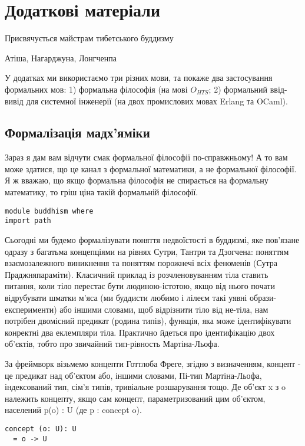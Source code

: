 \chapter{Додаткові матеріали}
\epigraph{Присвячується майстрам тибетського буддизму}{Атіша, Нагарджуна, Лонгченпа}

У додатках ми використаємо три різних мови, та покаже два застосування
формальних мов: 1) формальна філософія (на мові $O_{HTS}$; 2) формальний ввід-вивід для
системної інженерії (на двох промислових мовах Erlang та OCaml).

\section{Формалізація мадх'яміки}

Зараз я дам вам відчути смак формальної філософії по-справжньому!
А то вам може здатися, що це канал з формальної математики, а не
формальної філософії. Я ж вважаю, що якщо формальна філософія не
спирається на формальну математику, то гріш ціна такій формальній філософії.

\begin{lstlisting}
module buddhism where
import path
\end{lstlisting}

Сьогодні ми будемо формалізувати поняття недвоїстості в буддизмі,
яке пов'язане одразу з багатьма концепціями на рівнях Сутри, Тантри
та Дзогчена: поняттям взаємозалежного виникнення та поняттям порожнечі
всіх феноменів (Сутра Праджняпараміти). Класичний приклад із
розчленовуванням тіла ставить питання, коли тіло перестає бути
людиною-істотою, якщо від нього почати відрубувати шматки м'яса
(ми буддисти любимо і лілеєм такі уявні образи-експерименти) або
іншими словами, щоб відрізнити тіло від не-тіла, нам потрібен
двомісний предикат (родина типів), функція, яка може ідентифікувати
конректні два еклемпляри тіла. Практично йдеться про ідентифікацію
двох об'єктів, тобто про звичайний тип-рівность Мартіна-Льофа.

За фреймворк візьмемо концепти Готтлоба Фреге, згідно з визначенням,
концепт - це предикат над об'єктом або, іншими словами, Пі-тип
Мартіна-Льофа, індексований тип, сім'я типів, тривіальне розшарування тощо.
Де об'єкт x з o належить концепту, якщо сам концепт, параметризований
цим об'єктом, населений p(o) : U (де p : concept o).

\begin{lstlisting}
concept (o: U): U
  = o -> U
\end{lstlisting}

